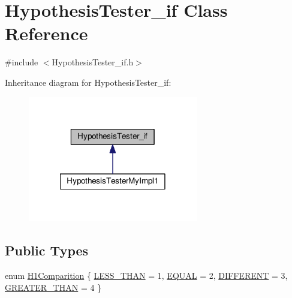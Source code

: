 \hypertarget{class_hypothesis_tester__if}{\section{Hypothesis\-Tester\-\_\-if Class Reference}
\label{class_hypothesis_tester__if}
}


{\ttfamily \#include $<$Hypothesis\-Tester\-\_\-if.\-h$>$}



Inheritance diagram for Hypothesis\-Tester\-\_\-if\-:\nopagebreak
\begin{figure}[H]
\begin{center}
\leavevmode
\includegraphics[width=210pt]{class_hypothesis_tester__if__inherit__graph}
\end{center}
\end{figure}
\subsection*{Public Types}
\begin{DoxyCompactItemize}
\item 
enum \hyperlink{class_hypothesis_tester__if_a89153ff990252f9f79856a2f2532c349}{H1\-Comparition} \{ \hyperlink{class_hypothesis_tester__if_a89153ff990252f9f79856a2f2532c349a58aba9f031dcbe91654e790416d84969}{L\-E\-S\-S\-\_\-\-T\-H\-A\-N} = 1, 
\hyperlink{class_hypothesis_tester__if_a89153ff990252f9f79856a2f2532c349a42d8b143727dc6856dddb0d0ce94c791}{E\-Q\-U\-A\-L} = 2, 
\hyperlink{class_hypothesis_tester__if_a89153ff990252f9f79856a2f2532c349acf8c0147414ce2a7cfdc8b26854464f8}{D\-I\-F\-F\-E\-R\-E\-N\-T} = 3, 
\hyperlink{class_hypothesis_tester__if_a89153ff990252f9f79856a2f2532c349ad0539d107f27b07e600a3c46da5b1934}{G\-R\-E\-A\-T\-E\-R\-\_\-\-T\-H\-A\-N} = 4
 \}
\end{DoxyCompactItemize}
